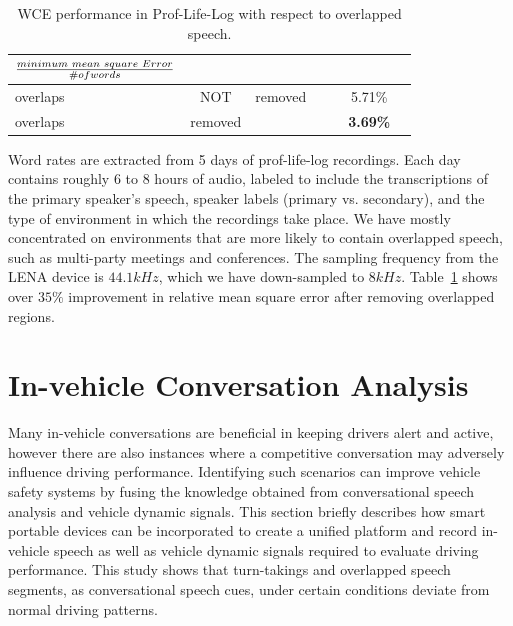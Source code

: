 \begin{table}[b!]
	\centering
	\renewcommand{\tabcolsep}{2.5 mm}
	\renewcommand{\arraystretch}{1.3}
	\vspace{0mm}
	\caption {WCE performance in Prof-Life-Log with respect to overlapped speech.}
	\label{tab:wce_ovl}
	\vspace{2mm}
	\begin{tabular}{p{0.8cm}*{6}{c}}
		\bf $\frac{minimum\hspace{1mm} mean \hspace{1mm} square \hspace{1mm} Error}{\# of words}$\\ \hline \hline
		overlaps & NOT&\hspace{-7mm}removed	&  &     &    5.71\% \\ 
		overlaps&\hspace{1mm} removed	&		&	&     &    \bf3.69\% \\ \hline
	\end{tabular}
	\vspace{-1mm}
\end{table} 

Word rates are extracted from 5 days of prof-life-log recordings. 
Each day contains roughly 6 to 8 hours of audio, labeled to include the transcriptions of the primary speaker's speech, speaker labels (primary vs. secondary), and the type of environment in which the recordings take place. 
We have mostly concentrated on environments that are more likely to contain overlapped speech, such as multi-party meetings and conferences.
The sampling frequency from the LENA device is $44.1kHz$, which we have down-sampled to $8kHz$. Table~\ref{tab:wce_ovl} shows over $35\%$ improvement in relative mean square error after removing overlapped regions. 


\newpage
\section{In-vehicle Conversation Analysis}
\label{sec:invehicle}
Many in-vehicle conversations are beneficial in keeping drivers alert and active, however there are also instances where a competitive conversation may adversely influence driving performance. 
Identifying such scenarios can improve vehicle safety systems by fusing the knowledge obtained from conversational speech analysis and vehicle dynamic signals. 
This section briefly describes how smart portable devices can be incorporated to create a unified platform and record in-vehicle speech as well as vehicle dynamic signals required to evaluate driving performance. 
This study shows that turn-takings and overlapped speech segments, as conversational speech cues, under certain conditions deviate from normal driving patterns. 

